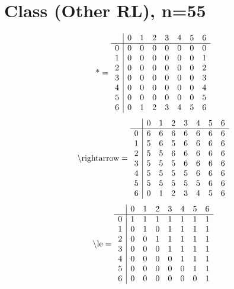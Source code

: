 \documentclass[11pt]{article}
\begin{document}
\section{Class (Other RL), n=55}
\[\text{*} = 
\begin{array}{r | r r r r r r r}
 & 0 & 1 & 2 & 3 & 4 & 5 & 6 \\ \hline
0 & 0 & 0 & 0 & 0 & 0 & 0 & 0 \\
1 & 0 & 0 & 0 & 0 & 0 & 0 & 1 \\
2 & 0 & 0 & 0 & 0 & 0 & 0 & 2 \\
3 & 0 & 0 & 0 & 0 & 0 & 0 & 3 \\
4 & 0 & 0 & 0 & 0 & 0 & 0 & 4 \\
5 & 0 & 0 & 0 & 0 & 0 & 0 & 5 \\
6 & 0 & 1 & 2 & 3 & 4 & 5 & 6 \\
\end{array}
\]
\[\text{\textbackslash rightarrow} = 
\begin{array}{r | r r r r r r r}
 & 0 & 1 & 2 & 3 & 4 & 5 & 6 \\ \hline
0 & 6 & 6 & 6 & 6 & 6 & 6 & 6 \\
1 & 5 & 6 & 5 & 6 & 6 & 6 & 6 \\
2 & 5 & 5 & 6 & 6 & 6 & 6 & 6 \\
3 & 5 & 5 & 5 & 6 & 6 & 6 & 6 \\
4 & 5 & 5 & 5 & 5 & 6 & 6 & 6 \\
5 & 5 & 5 & 5 & 5 & 5 & 6 & 6 \\
6 & 0 & 1 & 2 & 3 & 4 & 5 & 6 \\
\end{array}
\]
\[\text{\textbackslash le} = 
\begin{array}{r | r r r r r r r}
 & 0 & 1 & 2 & 3 & 4 & 5 & 6 \\ \hline
0 & 1 & 1 & 1 & 1 & 1 & 1 & 1 \\
1 & 0 & 1 & 0 & 1 & 1 & 1 & 1 \\
2 & 0 & 0 & 1 & 1 & 1 & 1 & 1 \\
3 & 0 & 0 & 0 & 1 & 1 & 1 & 1 \\
4 & 0 & 0 & 0 & 0 & 1 & 1 & 1 \\
5 & 0 & 0 & 0 & 0 & 0 & 1 & 1 \\
6 & 0 & 0 & 0 & 0 & 0 & 0 & 1 \\
\end{array}
\]
\end{document}
